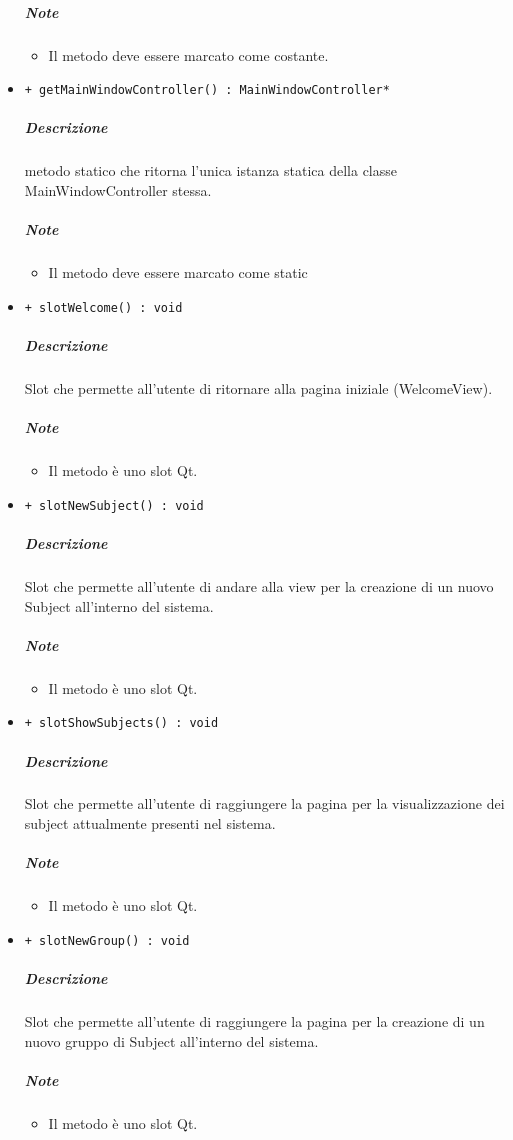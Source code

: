\begin{itemize}
			\subparagraph{Note}
			\begin{itemize}
				\item Il metodo deve essere marcato come costante.
			\end{itemize}
			\item \color{blue} \verb!+ getMainWindowController() : MainWindowController*!
			\color{black}
			\subparagraph{Descrizione} metodo statico che ritorna l'unica istanza statica della classe MainWindowController stessa.
			\subparagraph{Note}
			\begin{itemize}
				\item Il metodo deve essere marcato come static
			\end{itemize}
			\item \color{blue} \verb!+ slotWelcome() : void!
			\color{black}
			\subparagraph{Descrizione} Slot\g{} che permette all'utente di ritornare alla pagina iniziale (WelcomeView).
			\subparagraph{Note}
			\begin{itemize}
				\item Il metodo è uno slot\g{} Qt\g{}.
			\end{itemize}
			\item \color{blue} \verb!+ slotNewSubject() : void!
			\color{black}
			\subparagraph{Descrizione} Slot\g{} che permette all'utente di andare alla view per la creazione di un nuovo Subject\g{} all'interno del sistema.
			\subparagraph{Note}
			\begin{itemize}
				\item Il metodo è uno slot\g{} Qt\g{}.
			\end{itemize}
			\item \color{blue} \verb!+ slotShowSubjects() : void!
			\color{black}
			\subparagraph{Descrizione} Slot\g{} che permette all'utente di raggiungere la pagina per la visualizzazione dei subject\g{} attualmente presenti nel sistema.
			\subparagraph{Note}
			\begin{itemize}
				\item Il metodo è uno slot\g{} Qt\g{}.
			\end{itemize}
			\item \color{blue} \verb!+ slotNewGroup() : void!
			\color{black}
			\subparagraph{Descrizione} Slot\g{} che permette all'utente di raggiungere la pagina per la creazione di un nuovo gruppo di Subject\g{} all'interno del sistema.
			\subparagraph{Note}
			\begin{itemize}
				\item Il metodo è uno slot\g{} Qt\g{}.
			\end{itemize}

\end{itemize}
